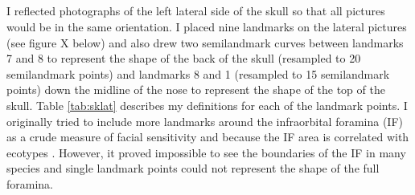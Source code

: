 \subsection{}
I reflected photographs of the left lateral side of the skull so that all pictures would be in the same orientation. I placed nine landmarks on the lateral pictures (see figure X below) and also drew two semilandmark curves between landmarks 7 and 8 to represent the shape of the back of the skull (resampled to 20 semilandmark points) and landmarks 8 and 1 (resampled to 15 semilandmark points) down the midline of the nose to represent the shape of the top of the skull. Table \ref{tab:sklat} describes my definitions for each of the landmark points.
I originally tried to include more landmarks around the infraorbital foramina (IF) as a crude measure of facial sensitivity and because the IF area is correlated with ecotypes \citep{Crumpton2012}. However, it proved impossible to see the boundaries of the IF in many species and single landmark points could not represent the shape of the full foramina. 


